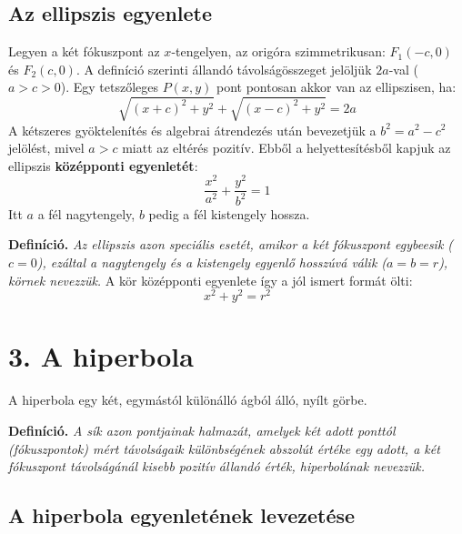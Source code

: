\documentclass[12pt, a4paper]{article}
\newcommand{\textbfr}[1]{\textbf{\textcolor{bvred}{#1}}}
\begin{document}
\subsection*{Az ellipszis egyenlete}

Legyen a két fókuszpont az $x$-tengelyen, az origóra szimmetrikusan: $F_1(-c, 0)$ és $F_2(c, 0)$. A definíció szerinti állandó távolságösszeget jelöljük $2a$-val ($a > c > 0$).
Egy tetszőleges $P(x,y)$ pont pontosan akkor van az ellipszisen, ha:
\[ \sqrt{(x+c)^2 + y^2} + \sqrt{(x-c)^2 + y^2} = 2a \]
A kétszeres gyöktelenítés és algebrai átrendezés után bevezetjük a $b^2 = a^2 - c^2$ jelölést, mivel $a > c$ miatt az eltérés pozitív. Ebből a helyettesítésből kapjuk az ellipszis \textbfr{középponti egyenletét}:
\[ \frac{x^2}{a^2} + \frac{y^2}{b^2} = 1 \]
Itt $a$ a fél nagytengely, $b$ pedig a fél kistengely hossza. 

\textbf{Definíció.} \textit{Az ellipszis azon speciális esetét, amikor a két fókuszpont egybeesik ($c=0$), ezáltal a nagytengely és a kistengely egyenlő hosszúvá válik ($a=b=r$), \textcolor{bvred}{körnek} nevezzük.}
A kör középponti egyenlete így a jól ismert formát ölti:
\[ x^2 + y^2 = r^2 \]

\section*{3. A hiperbola}

A hiperbola egy két, egymástól különálló ágból álló, nyílt görbe.

\textbf{Definíció.} \textit{A sík azon pontjainak halmazát, amelyek két adott ponttól (fókuszpontok) mért távolságaik különbségének abszolút értéke egy adott, a két fókuszpont távolságánál kisebb pozitív állandó érték, \textcolor{bvred}{hiperbolának} nevezzük.}

\subsection*{A hiperbola egyenletének levezetése}
\end{document}
